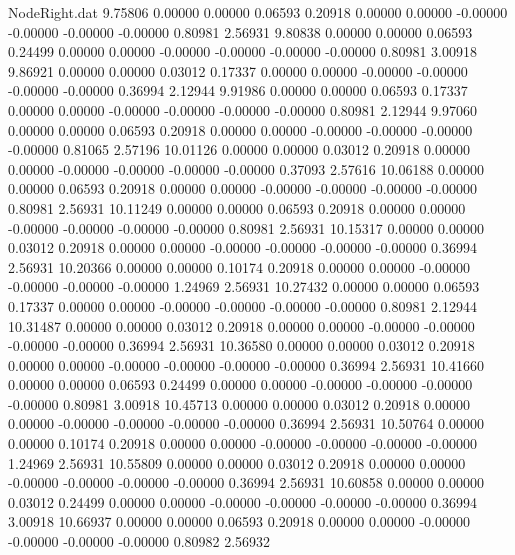 \begin{filecontents}{NodeRight.dat}
   9.75806    0.00000    0.00000     0.06593    0.20918    0.00000    0.00000   -0.00000   -0.00000   -0.00000   -0.00000    0.80981    2.56931
   9.80838    0.00000    0.00000     0.06593    0.24499    0.00000    0.00000   -0.00000   -0.00000   -0.00000   -0.00000    0.80981    3.00918
   9.86921    0.00000    0.00000     0.03012    0.17337    0.00000    0.00000   -0.00000   -0.00000   -0.00000   -0.00000    0.36994    2.12944
   9.91986    0.00000    0.00000     0.06593    0.17337    0.00000    0.00000   -0.00000   -0.00000   -0.00000   -0.00000    0.80981    2.12944
   9.97060    0.00000    0.00000     0.06593    0.20918    0.00000    0.00000   -0.00000   -0.00000   -0.00000   -0.00000    0.81065    2.57196
  10.01126    0.00000    0.00000     0.03012    0.20918    0.00000    0.00000   -0.00000   -0.00000   -0.00000   -0.00000    0.37093    2.57616
  10.06188    0.00000    0.00000     0.06593    0.20918    0.00000    0.00000   -0.00000   -0.00000   -0.00000   -0.00000    0.80981    2.56931
  10.11249    0.00000    0.00000     0.06593    0.20918    0.00000    0.00000   -0.00000   -0.00000   -0.00000   -0.00000    0.80981    2.56931
  10.15317    0.00000    0.00000     0.03012    0.20918    0.00000    0.00000   -0.00000   -0.00000   -0.00000   -0.00000    0.36994    2.56931
  10.20366    0.00000    0.00000     0.10174    0.20918    0.00000    0.00000   -0.00000   -0.00000   -0.00000   -0.00000    1.24969    2.56931
  10.27432    0.00000    0.00000     0.06593    0.17337    0.00000    0.00000   -0.00000   -0.00000   -0.00000   -0.00000    0.80981    2.12944
  10.31487    0.00000    0.00000     0.03012    0.20918    0.00000    0.00000   -0.00000   -0.00000   -0.00000   -0.00000    0.36994    2.56931
  10.36580    0.00000    0.00000     0.03012    0.20918    0.00000    0.00000   -0.00000   -0.00000   -0.00000   -0.00000    0.36994    2.56931
  10.41660    0.00000    0.00000     0.06593    0.24499    0.00000    0.00000   -0.00000   -0.00000   -0.00000   -0.00000    0.80981    3.00918
  10.45713    0.00000    0.00000     0.03012    0.20918    0.00000    0.00000   -0.00000   -0.00000   -0.00000   -0.00000    0.36994    2.56931
  10.50764    0.00000    0.00000     0.10174    0.20918    0.00000    0.00000   -0.00000   -0.00000   -0.00000   -0.00000    1.24969    2.56931
  10.55809    0.00000    0.00000     0.03012    0.20918    0.00000    0.00000   -0.00000   -0.00000   -0.00000   -0.00000    0.36994    2.56931
  10.60858    0.00000    0.00000     0.03012    0.24499    0.00000    0.00000   -0.00000   -0.00000   -0.00000   -0.00000    0.36994    3.00918
  10.66937    0.00000    0.00000     0.06593    0.20918    0.00000    0.00000   -0.00000   -0.00000   -0.00000   -0.00000    0.80982    2.56932

\end{filecontents}
